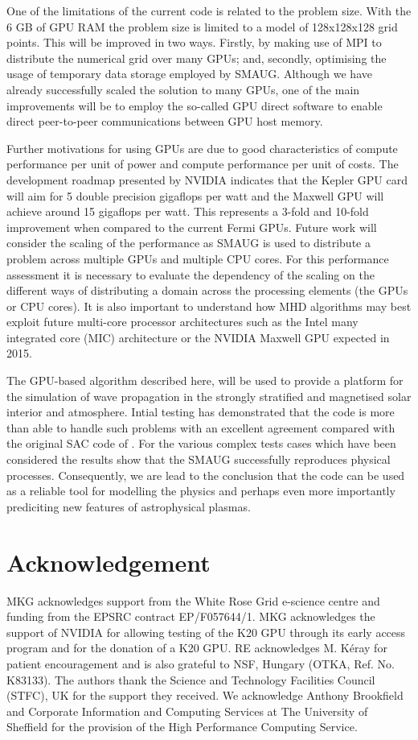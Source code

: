 One of the limitations of the current code is related to the problem size. With the 6 GB  of GPU RAM the problem size is limited to a model of 128x128x128 grid points. This will be improved in two ways. Firstly, by making use of MPI to distribute the numerical grid over many GPUs; and, secondly, optimising the usage of temporary data storage employed by SMAUG.  Although we have already successfully scaled the solution to many GPUs, one of the main improvements will be to employ the so-called GPU direct software to enable direct peer-to-peer communications between GPU host memory. 

Further motivations for using GPUs are due to good characteristics of compute performance per unit of power and compute performance per unit of costs. The development roadmap presented by NVIDIA indicates that the Kepler GPU card will aim for 5 double precision gigaflops per watt and the Maxwell GPU will achieve around 15 gigaflops per watt. This represents a 3-fold and 10-fold improvement when compared to the current Fermi GPUs.  Future work will consider the scaling of the performance as SMAUG is used to distribute a problem across multiple GPUs and multiple CPU cores. For this performance assessment it is necessary to evaluate the dependency of the scaling on the different ways of distributing a domain across the processing elements (the GPUs or CPU cores). It is also important to understand how MHD algorithms may best exploit future multi-core processor architectures such as the Intel many integrated core (MIC) architecture or the NVIDIA Maxwell GPU expected in 2015.

The GPU-based algorithm described here, will be used to provide a platform for the simulation of  wave propagation in the strongly stratified and magnetised solar interior and atmosphere. Intial testing has demonstrated that the code is more than able to handle such problems with an excellent agreement compared with the original SAC code of \citep{Shelyag et al. 2008}. For the various complex tests cases which have been considered the results show that the SMAUG successfully reproduces physical processes. Consequently, we are lead to the conclusion that the code can be used as a reliable tool for modelling the physics and perhaps even more importantly prediciting new features of astrophysical plasmas.




\section{Acknowledgement}
MKG acknowledges support from the White Rose Grid e-science centre and funding from the EPSRC contract EP/F057644/1.
MKG acknowledges the support of NVIDIA for allowing testing of the K20 GPU through its early access program and for the donation of a K20 GPU. 
RE acknowledges M. K\'eray for patient encouragement and is also grateful to NSF, Hungary (OTKA, Ref. No. K83133). 
The authors thank the Science and Technology Facilities Council (STFC), UK for the support they received. We acknowledge Anthony Brookfield and Corporate Information and Computing Services at The University of Sheffield for the provision of the High Performance Computing Service.

